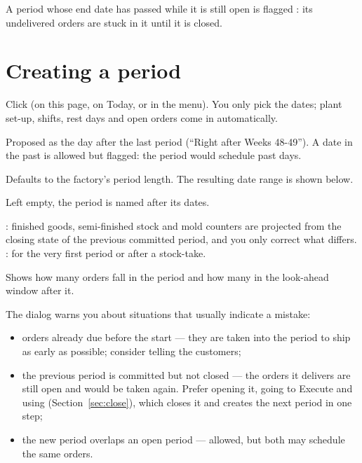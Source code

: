 A period whose end date has passed while it is still open is flagged : its undelivered
orders are stuck in it until it is closed.

\section{Creating a period}\label{sec:new-period}

Click  (on this page, on Today, or in the  menu). You only pick the dates; plant
set-up, shifts, rest days and open orders come in automatically.


\begin{description}[style=nextline, leftmargin=1.2em, font=\bfseries\color{brand}]
  \item[Starts] Proposed as the day after the last period (``Right after Weeks 48-49''). A date in the past is
        allowed but flagged: the period would schedule past days.
  \item[Days] Defaults to the factory's period length. The resulting date range is shown below.
  \item[Name (optional)] Left empty, the period is named after its dates.
  \item[Opening stock] : finished goods, semi-finished stock and mold
        counters are projected from the closing state of the previous committed period, and you only correct
        what differs. : for the very first period or after a stock-take.
  \item[Take open orders from the order book] Shows how many orders fall in the period and how many in the
        look-ahead window after it.
\end{description}

The dialog warns you about situations that usually indicate a mistake:

\begin{itemize}
  \item orders already due before the start --- they are taken into the period to ship as early as possible;
        consider telling the customers;
  \item the previous period is committed but not closed --- the orders it delivers are still open and would
        be taken again. Prefer opening it, going to Execute and using 
        (Section~\ref{sec:close}), which closes it and creates the next period in one step;
  \item the new period overlaps an open period --- allowed, but both may schedule the same orders.
\end{itemize}

